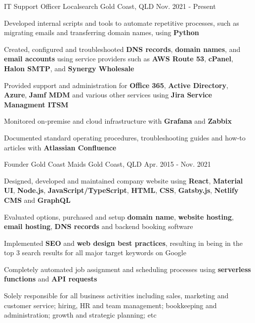 \begin{cventries}
  \cventry
    {IT Support Officer}
    {Localsearch}
    {Gold Coast, QLD}
    {Nov. 2021 - Present}
    {
      \begin{cvitems}
        \item {Developed internal scripts and tools to automate repetitive processes, such as migrating emails and transferring domain names, using \textbf{Python}}
        \item {Created, configured and troubleshooted \textbf{DNS records}, \textbf{domain names}, and \textbf{email accounts} using service providers such as \textbf{AWS Route 53}, \textbf{cPanel}, \textbf{Halon SMTP}, and \textbf{Synergy Wholesale}}
        \item {Provided support and administration for \textbf{Office 365}, \textbf{Active Directory}, \textbf{Azure}, \textbf{Jamf MDM} and various other services using \textbf{Jira Service Managment ITSM}}
        \item {Monitored on-premise and cloud infrastructure with \textbf{Grafana} and \textbf{Zabbix}}
        \item {Documented standard operating procedures, troubleshooting guides and how-to articles with \textbf{Atlassian Confluence}}
      \end{cvitems}
    }
  \cventry
    {Founder}
    {Gold Coast Maids}
    {Gold Coast, QLD}
    {Apr. 2015 - Nov. 2021}
    {
      \begin{cvitems}
        \item {Designed, developed and maintained company website using \textbf{React}, \textbf{Material UI}, \textbf{Node.js}, \textbf{JavaScript/TypeScript}, \textbf{HTML}, \textbf{CSS}, \textbf{Gatsby.js}, \textbf{Netlify CMS} and \textbf{GraphQL}}
        \item {Evaluated options, purchased and setup \textbf{domain name}, \textbf{website hosting}, \textbf{email hosting}, \textbf{DNS records} and backend booking software}
        \item {Implemented \textbf{SEO} and \textbf{web design best practices}, resulting in being in the top 3 search results for all major target keywords on Google}
        \item {Completely automated job assignment and scheduling processes using \textbf{serverless functions} and \textbf{API requests}}
        \item {Solely responsible for all business activities including sales, marketing and customer service; hiring, HR and team management; bookkeeping and administration; growth and strategic planning; etc}

\end{cvitems}}
\end{cventries}
